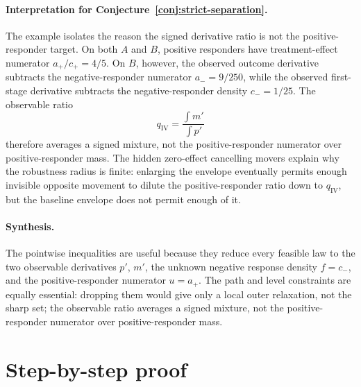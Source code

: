 \documentclass[11pt]{article}
\theoremstyle{definition}
\theoremstyle{plain}
\theoremstyle{remark}
\begin{document}
\paragraph{Interpretation for Conjecture~\ref{conj:strict-separation}.}
The example isolates the reason the signed derivative ratio is not the
positive-responder target.  On both \(A\) and \(B\), positive responders have
treatment-effect numerator \(a_+/c_+=4/5\).  On \(B\), however, the observed
outcome derivative subtracts the negative-responder numerator
\(a_-=9/250\), while the observed first-stage derivative subtracts the
negative-responder density \(c_-=1/25\).  The observable ratio
\[
q_{\mathrm{IV}}=\frac{\int m'}{\int p'}
\]
therefore averages a signed mixture, not the positive-responder numerator over
positive-responder mass.  The hidden zero-effect cancelling movers explain why
the robustness radius is finite: enlarging the envelope eventually permits
enough invisible opposite movement to dilute the positive-responder ratio down
to \(q_{\mathrm{IV}}\), but the baseline envelope does not permit enough of it.

\paragraph{Synthesis.}
The pointwise inequalities are useful because they reduce every feasible law
to the two observable derivatives \(p'\), \(m'\), the unknown negative response
density \(f=c_-\), and the positive-responder numerator \(u=a_+\).  The path
and level constraints are equally essential: dropping them would give only a
local outer relaxation, not the sharp set; the observable ratio averages a
signed mixture, not the positive-responder numerator over positive-responder
mass.

\section{Step-by-step proof}
\end{document}
